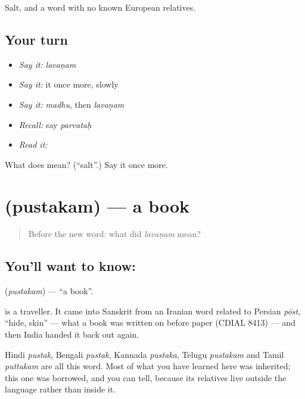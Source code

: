 \begin{grammarlens}[title={What you've built}]
Salt, and a word with no known European relatives.
\end{grammarlens}

\subsection*{Your turn}
\begin{itemize}
\raggedright
  \item \emph{Say it:} \emph{lavaṇam}
  \item \emph{Say it:} it once more, slowly
  \item \emph{Say it:} \emph{madhu}, then \emph{lavaṇam}
  \item \emph{Recall:} say \emph{parvataḥ}
  \item \emph{Read it:} \textbf{}
\end{itemize}

\begin{tcolorbox}[breakable,colback=teal!4,colframe=teal!35!black,title={Before you move on}]
What does  mean? (\textquotedblleft{}salt\textquotedblright{}.) Say it once more.
\end{tcolorbox}
\section[\texorpdfstring{\sk{पुस्तकम्} (pustakam)}{पुस्तकम् (pustakam)}]{ (pustakam) — a book}

\label{lesson:SA-C35-book}



\begin{quote}
Before the new word: what did \emph{lavaṇam} mean?
\end{quote}

\subsection*{You'll want to know: }
\textbf{} (\emph{pustakam}) — \textquotedblleft{}a book\textquotedblright{}.

\textbf{} is a traveller. It came into Sanskrit from an Iranian word related to Persian \emph{pōst}, \textquotedblleft{}hide, skin\textquotedblright{} — what a book was written on before paper (CDIAL 8413) — and then India handed it back out again.

Hindi \emph{pustak}, Bengali \emph{pustak}, Kannada \emph{pustaka}, Telugu \emph{pustakam} and Tamil \emph{puttakam} are all this word. Most of what you have learned here was inherited; this one was borrowed, and you can tell, because its relatives live outside the language rather than inside it.


